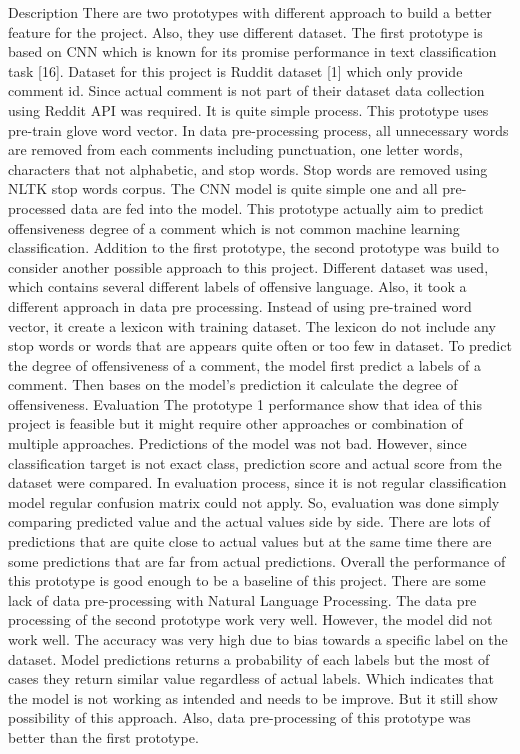\documentclass[12pt, natbib=false]{article}
\begin{document}
Description
There are two prototypes with different approach to build a better feature for the project. Also, they use different dataset. The first prototype is based on CNN which is known for its promise performance in text classification task [16]. Dataset for this project is Ruddit dataset [1] which only provide comment id. Since actual comment is not part of their dataset data collection using Reddit API was required. It is quite simple process. This prototype uses pre-train glove word vector. In data pre-processing process, all unnecessary words are removed from each comments including punctuation, one letter words, characters that not alphabetic, and stop words. Stop words are removed using NLTK stop words corpus. The CNN model is quite simple one and all pre-processed data are fed into the model. This prototype actually aim to predict offensiveness degree of a comment which is not common machine learning classification. Addition to the first prototype, the second prototype was build to consider another possible approach to this project. Different dataset was used, which contains several different labels of offensive language.  Also, it took a different approach in data pre processing. Instead of using pre-trained word vector, it create a lexicon with training dataset. The lexicon do not include any stop words or words that are appears quite often or too few in dataset. To predict the degree of offensiveness of a comment, the model first predict a labels of a comment. Then bases on the model’s prediction it calculate the degree of offensiveness.
Evaluation
The prototype 1 performance show that idea of this project is feasible but it might require other approaches or combination of multiple approaches. Predictions of the model was not bad. However, since classification target is not exact class, prediction score and actual score from the dataset were compared. In evaluation process, since it is not regular classification model regular confusion matrix could not apply. So, evaluation was done simply comparing predicted value and the actual values side by side. There are lots of predictions that are quite close to actual values but at the same time there are some predictions that are far from actual predictions. Overall the performance of this prototype is good enough to be a baseline of this project. There are some lack of data pre-processing with Natural Language Processing. The data pre processing of the second prototype work very well.  However, the model did not work well. The accuracy was very high due to bias towards a specific label on the dataset. Model predictions returns a probability of each labels but the most of cases they return similar value regardless of actual labels. Which indicates that the model is not working as intended and needs to be improve. But it still show possibility of this approach. Also, data pre-processing of this prototype was better than the first prototype.
\end{document}
